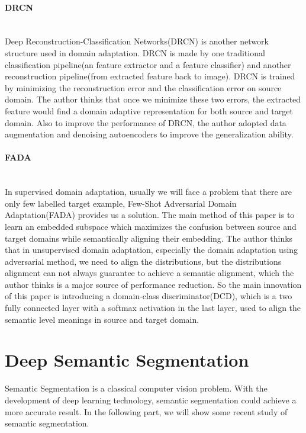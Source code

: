 \documentclass{kththesis}
\begin{document}
\paragraph{DRCN}~{}\\

\noindent Deep Reconstruction-Classification Networks\cite{ghifary2016deep}(DRCN) is another network structure used in domain adaptation. DRCN is made by one traditional classification pipeline(an feature extractor and a feature classifier) and another reconstruction pipeline(from extracted feature back to image). DRCN is trained by minimizing the reconstruction error and the classification error on source domain. The author thinks that once we minimize these two errors, the extracted feature would find a domain adaptive representation for both source and target domain. Also to improve the performance of DRCN, the author adopted data augmentation and denoising autoencoders to improve the generalization ability.

\paragraph{FADA}~{}\\

\noindent In supervised domain adaptation, usually we will face a problem that there are only few labelled target example, Few-Shot Adversarial Domain Adaptation(FADA)\cite{motiian2017few} provides us a solution. The main method of this paper is to learn an embedded subspace which maximizes the confusion between source and target domains while semantically aligning their embedding. The author thinks that in unsupervised domain adaptation, especially the domain adaptation using adversarial method, we need to align the distributions, but the distributions alignment can not always guarantee to achieve a semantic alignment, which the author thinks is a major source of performance reduction. So the main innovation of this paper is introducing a domain-class discriminator(DCD), which is a two fully connected layer with a softmax activation in the last layer, used to align the semantic level meanings in source and target domain.

\section{Deep Semantic Segmentation}
Semantic Segmentation is a classical computer vision problem. With the development of deep learning technology, semantic segmentation could achieve a more accurate result. In the following part, we will show some recent study of semantic segmentation.
\end{document}
